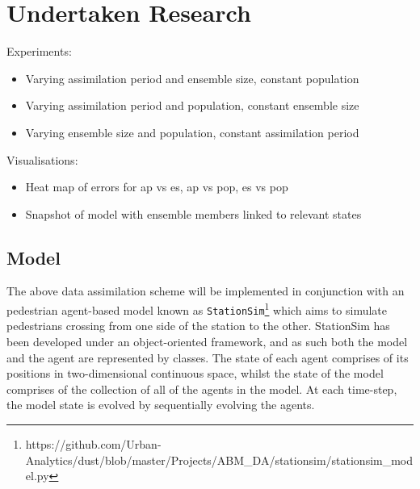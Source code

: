 \section{Undertaken Research}\label{sec:research}

Experiments:
\begin{itemize}
    \item Varying assimilation period and ensemble size, constant population
    \item Varying assimilation period and population, constant ensemble size
    \item Varying ensemble size and population, constant assimilation period
\end{itemize}

Visualisations:
\begin{itemize}
    \item Heat map of errors for ap vs es, ap vs pop, es vs pop
    \item Snapshot of model with ensemble members linked to relevant states
\end{itemize}

\subsection{Model}\label{sub:method:model}

The above data assimilation scheme will be implemented in conjunction with an
pedestrian agent-based model known as
\texttt{StationSim}\footnote{https://github.com/Urban-Analytics/dust/blob/master/Projects/ABM\_DA/stationsim/stationsim\_model.py}
which aims to simulate pedestrians crossing from one side of the station to the
other.
StationSim has been developed under an object-oriented framework, and as such
both the model and the agent are represented by classes.
The state of each agent comprises of its positions in two-dimensional continuous
space, whilst the state of the model comprises of the collection of all of the
agents in the model.
At each time-step, the model state is evolved by sequentially evolving the
agents.

